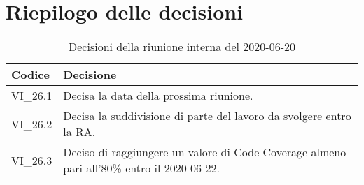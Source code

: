 \section{Riepilogo delle decisioni}
\begin{longtable}{ 
	 >{\centering}p{} >{}p{} }
	
	\caption{Decisioni della riunione interna del 2020-06-20}\\	
	
	\textbf{\color{white}Codice} & 
	\textbf{\color{white}Decisione} 
	\tabularnewline  
	\endhead
	
	VI\_26.1 & Decisa la data della prossima riunione. \\
	VI\_26.2 & Decisa la suddivisione di parte del lavoro da svolgere entro la RA. \\
	VI\_26.3 & Deciso di raggiungere un valore di Code Coverage almeno pari all'80\% entro il 2020-06-22. \\
\end{longtable}
